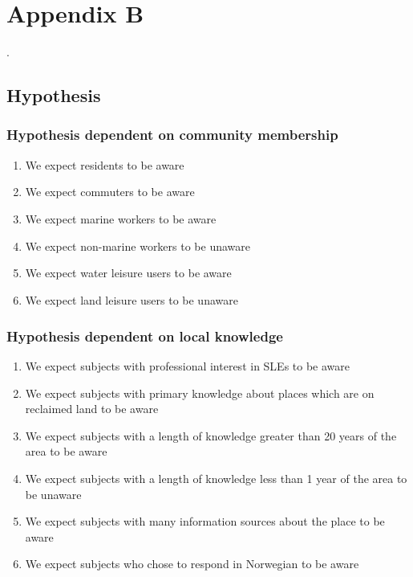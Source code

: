 
\chapter{Appendix B}
.

\section{Hypothesis}

\subsection{Hypothesis dependent on community membership}
\begin{enumerate}
    \item We expect residents to be aware
    \item We expect commuters to be aware
    \item We expect marine workers to be aware
    \item We expect non-marine workers to be unaware
    \item We expect water leisure users to be aware
    \item We expect land leisure users to be unaware
    \end{enumerate}
\paragraph{}

\subsection{Hypothesis dependent on local knowledge}
\begin{enumerate}
    \item We expect subjects with professional interest in SLEs to be aware
    \item We expect subjects with primary knowledge about places which are on reclaimed land to be aware
    \item We expect subjects with a length of knowledge greater than 20 years of the area to be aware
    \item We expect subjects with a length of knowledge less than 1 year of the area to be unaware
    \item We expect subjects with many information sources about the place to be aware
    \item We expect subjects who chose to respond in Norwegian to be aware
\end{enumerate}
